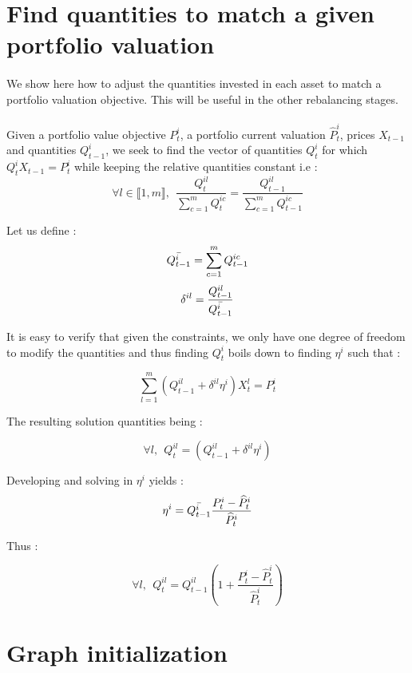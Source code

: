 \documentclass{article}
\begin{document}
\begin{appendices}

\section{Find quantities to match a given portfolio valuation}\label{matching_quantities}
\paragraph{}
We show here how to adjust the quantities invested in each asset to match a portfolio valuation objective. This will be useful in the other rebalancing stages.

\paragraph{}
Given a portfolio value objective $P_t^{i}$, a portfolio current valuation $\widehat {P}_t^{i}$, prices $X_{t-1}$ and quantities $Q_{t-1}^i$, we seek to find the vector of quantities $Q_t^{i}$ for which $Q_t^{i}X_{t-1} = P_t^{i}$ while keeping the relative quantities constant i.e : 
$$\forall l \in \llbracket 1, m \rrbracket,~~ \frac{Q_t^{il}}{\sum_{c=1}^m Q_t^{ic}} = \frac{Q_{t-1}^{il}}{\sum_{c=1}^m Q_{t-1}^{ic}}$$

Let us define : $$\Bar{Q_{t-1}^i} = \sum_{c=1}^m Q_{t-1}^{ic}$$
$$\delta^{il} = \frac{Q_{t-1}^{il}}{\Bar{Q_{t-1}^i}}$$


It is easy to verify that given the constraints, we only have one degree of freedom to modify the quantities and thus finding $Q_t^{i}$ boils down to finding $\eta^i$ such that : 

$$\sum_{l=1}^m (Q_{t-1}^{il} + \delta^{il}\eta^i)X_t^l = P_t^{i}$$

The resulting solution quantities being :

$$\forall l,~~ Q_t^{il} =  (Q_{t-1}^{il} + \delta^{il}\eta^i) $$

Developing and solving in $\eta^i$ yields : 
$$ \eta^i = \Bar{Q_{t-1}^i} \frac{P_t^{i} - \widehat{P}_t^i}{\widehat{P}_t^i}$$

Thus : 

\begin{equation*}
\forall l,~~ Q_t^{il} = Q_{t-1}^{il}\left(1 + \frac{P_t^{i} - \widehat{P}_t^i}{\widehat{P}_t^i} \right)
\end{equation*}

\section{Graph initialization}


\end{appendices}
\end{document}
